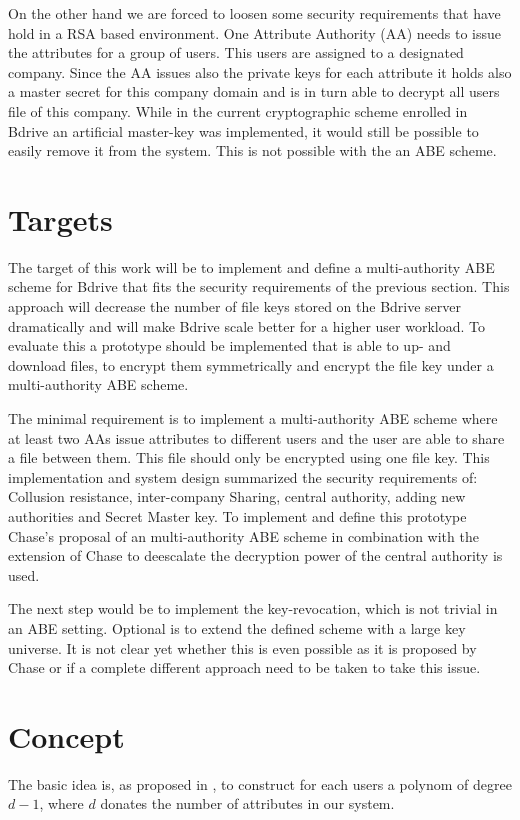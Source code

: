 \documentclass[twocolumn]{article}
\begin{document}
On the other hand we are forced to loosen some security requirements that have hold in a RSA based environment. One Attribute Authority (AA) needs to issue the attributes for a group of users. This users are assigned to a designated company. Since the AA issues also the private keys for each attribute it holds also a master secret for this company domain and is in turn able to decrypt all users file of this company. While in the current cryptographic scheme enrolled in Bdrive an artificial master-key was implemented, it would still be possible to easily remove it from the system. This is not possible with the an ABE scheme. 


\section{Targets}
The target of this work will be to implement and define a multi-authority ABE scheme for Bdrive that fits the security requirements of the previous section. This approach will decrease the number of file keys stored on the Bdrive server dramatically and will make Bdrive scale better for a higher user workload. To evaluate this a prototype should be implemented that is able to up- and download files, to encrypt them symmetrically and encrypt the file key under a multi-authority ABE scheme. 

The minimal requirement is to implement a multi-authority ABE scheme where at least two AAs issue attributes to different users and the user are able to share a file between them. This file should only be encrypted using one file key. This implementation and system design summarized the security requirements of: Collusion resistance, inter-company Sharing, central authority, adding new authorities and Secret Master key. To implement and define this prototype Chase’s proposal of an multi-authority ABE scheme \cite{chase2007multi} in combination with the extension of Chase to deescalate the decryption power of the central authority \cite{chase2009improving} is used. 

The next step would be to implement the key-revocation, which is not trivial in an ABE setting. Optional is to extend the defined scheme with a large key universe. It is not clear yet whether this is even possible as it is proposed by Chase or if a complete different approach need to be taken to take this issue. 



\section{Concept}
The basic idea is, as proposed in \cite{chase2007multi}, to construct for each users a polynom of degree $d-1$, where $d$ donates the number of attributes in our system. 
\end{document}
